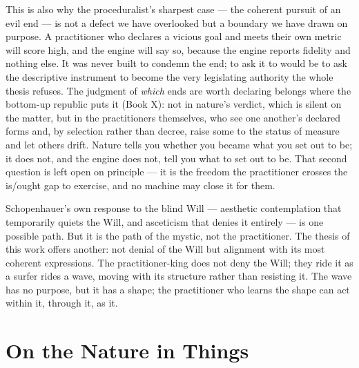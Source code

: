This is also why the proceduralist's sharpest case --- the coherent pursuit of an
evil end --- is not a defect we have overlooked but a boundary we have drawn on
purpose. A practitioner who declares a vicious goal and meets their own metric will
score high, and the engine will say so, because the engine reports fidelity and
nothing else. It was never built to condemn the end; to ask it to would be to ask the
descriptive instrument to become the very legislating authority the whole thesis
refuses. The judgment of \emph{which} ends are worth declaring belongs where the
bottom-up republic puts it (Book X): not in nature's verdict, which is silent on the
matter, but in the practitioners themselves, who see one another's declared forms
and, by selection rather than decree, raise some to the status of measure and let
others drift. Nature tells you whether you became what you set out to be; it does not,
and the engine does not, tell you what to set out to be. That second question is left
open on principle --- it is the freedom the practitioner crosses the is/ought gap to
exercise, and no machine may close it for them.

Schopenhauer's own response to the blind Will --- aesthetic contemplation that
temporarily quiets the Will, and asceticism that denies it entirely --- is one
possible path. But it is the path of the mystic, not the practitioner. The
thesis of this work offers another: not denial of the Will but alignment with
its most coherent expressions. The practitioner-king does not deny the Will;
they ride it as a surfer rides a wave, moving with its structure rather than
resisting it. The wave has no purpose, but it has a shape; the practitioner
who learns the shape can act within it, through it, as it.

\section{On the Nature in Things}

